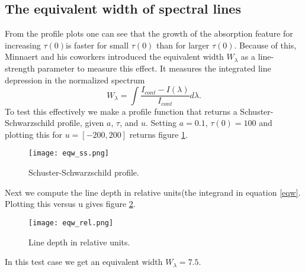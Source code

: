 \documentclass{aa}   %
\begin{document}
\subsection{The equivalent width of spectral lines}
From the profile plots one can see that the growth of the absorption feature for increasing $\tau(0)$is faster for small $\tau(0)$ than for larger $\tau(0)$. Because of this, Minnaert and his coworkers introduced the equivalent width $W_\lambda$ as a line-strength parameter to measure this effect. It measures the integrated line depression in the normalized spectrum
\begin{equation}
 W_\lambda = \int \frac{I_{cont}-I(\lambda)}{I_{cont}}d\lambda.
\end{equation}\label{eqw}
To test this effectively we make a profile function that returns a Schuster-Schwarzschild profile, given $a$, $\tau$, and $u$.  Setting $a = 0.1$, $\tau(0) = 100$ and plotting this for $ u = [-200,200]$ returns figure \ref{eqw_ss}.
\begin{figure}
 \texttt{[image: eqw\_ss.png]}
 \caption{Schuster-Schwarzschild profile.}
 \label{eqw_ss} 
\end{figure}

Next we compute the line depth in relative units(the integrand in equation \ref{eqw}. Plotting this versus u gives figure \ref{eqw_rel}.
\begin{figure}
 \texttt{[image: eqw\_rel.png]}
 \caption{Line depth in relative units.}
 \label{eqw_rel} 
\end{figure}

In this test case we get an equivalent width $W_\lambda = 7.5$.
\end{document}
